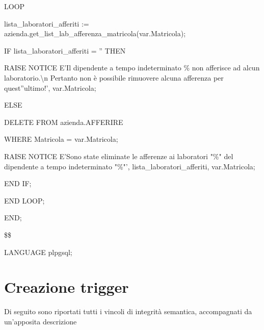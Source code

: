 \begin{flushleft}
\begin{description}
\begin{description}
                        \item LOOP
                        \begin{description}
                            \item lista\_laboratori\_afferiti := azienda.get\_list\_lab\_afferenza\_matricola(var.Matricola);
                            \vspace{0.5cm}
                            \item IF lista\_laboratori\_afferiti = '' THEN
                            \begin{description}
                                \item RAISE NOTICE E'Il dipendente a tempo indeterminato \% non afferisce ad alcun laboratorio.\textbackslash{n} Pertanto non è possibile rimuovere alcuna afferenza per quest''ultimo!', var.Matricola;
                            \end{description}

                            \item ELSE
                            \begin{description}
                                \item DELETE FROM azienda.AFFERIRE
                                \item WHERE Matricola = var.Matricola;
                            \end{description}

                            \item RAISE NOTICE E'Sono state eliminate le afferenze ai laboratori "\%" del dipendente a tempo indeterminato "\%"', lista\_laboratori\_afferiti, var.Matricola;
                            \item END IF;
                        \end{description}
                        \item END LOOP;
                    \end{description}
                    \item END;
                    \item \$\$
                    \item LANGUAGE plpgsql;
                \end{description}
            \end{flushleft}
        \normalfont

    \newpage

    \section{Creazione trigger}
    Di seguito sono riportati tutti i vincoli di integrità semantica, accompagnati da un'apposita descrizione
    
